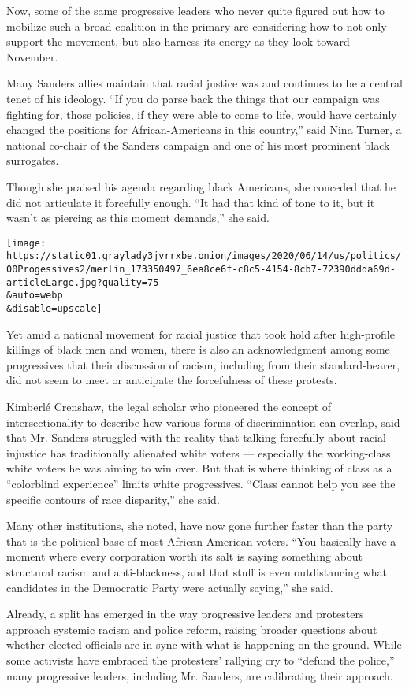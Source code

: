 Now, some of the same progressive leaders who never quite figured out
how to mobilize such a broad coalition in the primary are considering
how to not only support the movement, but also harness its energy as
they look toward November.

Many Sanders allies maintain that racial justice was and continues to be
a central tenet of his ideology. ``If you do parse back the things that
our campaign was fighting for, those policies, if they were able to come
to life, would have certainly changed the positions for
African-Americans in this country,'' said Nina Turner, a national
co-chair of the Sanders campaign and one of his most prominent black
surrogates.

Though she praised his agenda regarding black Americans, she conceded
that he did not articulate it forcefully enough. ``It had that kind of
tone to it, but it wasn't as piercing as this moment demands,'' she
said.

\texttt{[image: https://static01.graylady3jvrrxbe.onion/images/2020/06/14/us/politics/00Progessives2/merlin\_173350497\_6ea8ce6f-c8c5-4154-8cb7-72390ddda69d-articleLarge.jpg?quality=75\\\&auto=webp\\\&disable=upscale]}

Yet amid a national movement for racial justice that took hold after
high-profile killings of black men and women, there is also an
acknowledgment among some progressives that their discussion of racism,
including from their standard-bearer, did not seem to meet or anticipate
the forcefulness of these protests.

Kimberlé Crenshaw, the legal scholar who pioneered the concept of
intersectionality to describe how various forms of discrimination can
overlap, said that Mr. Sanders struggled with the reality that talking
forcefully about racial injustice has traditionally alienated white
voters --- especially the working-class white voters he was aiming to
win over. But that is where thinking of class as a ``colorblind
experience'' limits white progressives. ``Class cannot help you see the
specific contours of race disparity,'' she said.

Many other institutions, she noted, have now gone further faster than
the party that is the political base of most African-American voters.
``You basically have a moment where every corporation worth its salt is
saying something about structural racism and anti-blackness, and that
stuff is even outdistancing what candidates in the Democratic Party were
actually saying,'' she said.

Already, a split has emerged in the way progressive leaders and
protesters approach systemic racism and police reform, raising broader
questions about whether elected officials are in sync with what is
happening on the ground. While some activists have embraced the
protesters' rallying cry to ``defund the police,'' many progressive
leaders, including Mr. Sanders, are calibrating their approach.

